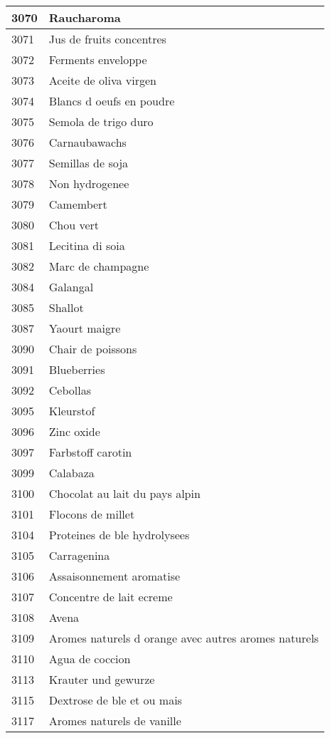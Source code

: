 \begin{longtable}{|l|l|}
3070 & Raucharoma \\ \hline 
3071 & Jus de fruits concentres \\ \hline 
3072 & Ferments enveloppe \\ \hline 
3073 & Aceite de oliva virgen \\ \hline 
3074 & Blancs d oeufs en poudre \\ \hline 
3075 & Semola de trigo duro \\ \hline 
3076 & Carnaubawachs \\ \hline 
3077 & Semillas de soja \\ \hline 
3078 & Non hydrogenee \\ \hline 
3079 & Camembert \\ \hline 
3080 & Chou vert \\ \hline 
3081 & Lecitina di soia \\ \hline 
3082 & Marc de champagne \\ \hline 
3084 & Galangal \\ \hline 
3085 & Shallot \\ \hline 
3087 & Yaourt maigre \\ \hline 
3090 & Chair de poissons \\ \hline 
3091 & Blueberries \\ \hline 
3092 & Cebollas \\ \hline 
3095 & Kleurstof \\ \hline 
3096 & Zinc oxide \\ \hline 
3097 & Farbstoff carotin \\ \hline 
3099 & Calabaza \\ \hline 
3100 & Chocolat au lait du pays alpin \\ \hline 
3101 & Flocons de millet \\ \hline 
3104 & Proteines de ble hydrolysees \\ \hline 
3105 & Carragenina \\ \hline 
3106 & Assaisonnement aromatise \\ \hline 
3107 & Concentre de lait ecreme \\ \hline 
3108 & Avena \\ \hline 
3109 & Aromes naturels d orange avec autres aromes naturels \\ \hline 
3110 & Agua de coccion \\ \hline 
3113 & Krauter und gewurze \\ \hline 
3115 & Dextrose de ble et ou mais \\ \hline 
3117 & Aromes naturels de vanille \\ \hline 

\end{longtable}
